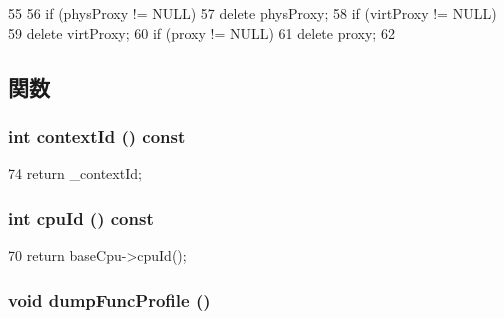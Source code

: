 \begin{DoxyCode}
55 {
56     if (physProxy != NULL)
57         delete physProxy;
58     if (virtProxy != NULL)
59         delete virtProxy;
60     if (proxy != NULL)
61         delete proxy;
62 }
\end{DoxyCode}


\subsection{関数}
\hypertarget{structThreadState_a651d5d14e7a4e95ebe6d7f5b8ee5a107}{
\subsubsection[{contextId}]{\setlength{\rightskip}{0pt plus 5cm}int contextId () const}}
\label{structThreadState_a651d5d14e7a4e95ebe6d7f5b8ee5a107}



\begin{DoxyCode}
74 { return _contextId; }
\end{DoxyCode}
\hypertarget{structThreadState_a1e2d18ebf4e21f2416c21a8b072e2c7b}{
\subsubsection[{cpuId}]{\setlength{\rightskip}{0pt plus 5cm}int cpuId () const}}
\label{structThreadState_a1e2d18ebf4e21f2416c21a8b072e2c7b}



\begin{DoxyCode}
70 { return baseCpu->cpuId(); }
\end{DoxyCode}
\hypertarget{structThreadState_a13fa12d1779a94a1e0b968946a1367c7}{
\subsubsection[{dumpFuncProfile}]{\setlength{\rightskip}{0pt plus 5cm}void dumpFuncProfile ()}}
\label{structThreadState_a13fa12d1779a94a1e0b968946a1367c7}


